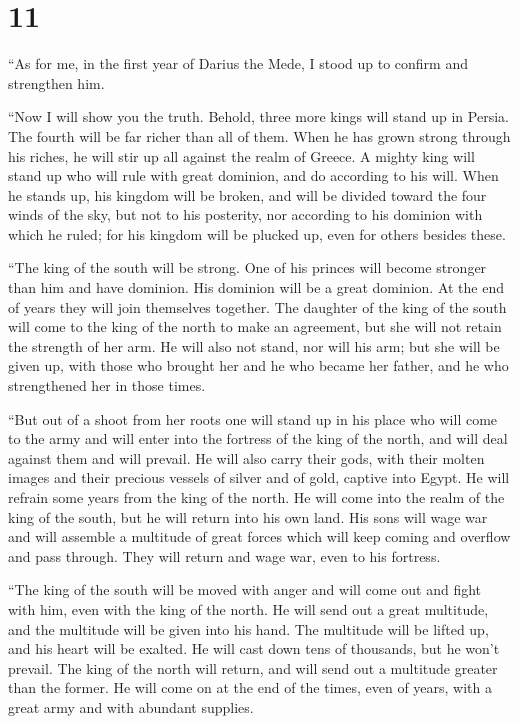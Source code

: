 \hypertarget{section-10}{%
\section{11}\label{section-10}}

 ``As for me, in the first year of Darius the Mede, I stood
up to confirm and strengthen him.

 ``Now I will show you the truth. Behold, three more kings
will stand up in Persia. The fourth will be far richer than all of them.
When he has grown strong through his riches, he will stir up all against
the realm of Greece.  A mighty king will stand up who will
rule with great dominion, and do according to his will. 
When he stands up, his kingdom will be broken, and will be divided
toward the four winds of the sky, but not to his posterity, nor
according to his dominion with which he ruled; for his kingdom will be
plucked up, even for others besides these.

 ``The king of the south will be strong. One of his princes
will become stronger than him and have dominion. His dominion will be a
great dominion.  At the end of years they will join
themselves together. The daughter of the king of the south will come to
the king of the north to make an agreement, but she will not retain the
strength of her arm. He will also not stand, nor will his arm; but she
will be given up, with those who brought her and he who became her
father, and he who strengthened her in those times.

 ``But out of a shoot from her roots one will stand up in
his place who will come to the army and will enter into the fortress of
the king of the north, and will deal against them and will prevail.
 He will also carry their gods, with their molten images and
their precious vessels of silver and of gold, captive into Egypt. He
will refrain some years from the king of the north.  He will
come into the realm of the king of the south, but he will return into
his own land.  His sons will wage war and will assemble a
multitude of great forces which will keep coming and overflow and pass
through. They will return and wage war, even to his fortress.

 ``The king of the south will be moved with anger and will
come out and fight with him, even with the king of the north. He will
send out a great multitude, and the multitude will be given into his
hand.  The multitude will be lifted up, and his heart will
be exalted. He will cast down tens of thousands, but he won't prevail.
 The king of the north will return, and will send out a
multitude greater than the former. He will come on at the end of the
times, even of years, with a great army and with abundant supplies.

